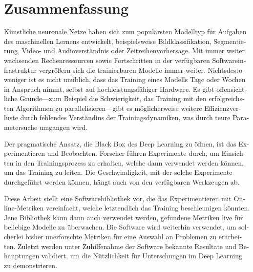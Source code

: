 \chapter*{Zusammenfassung}

\begin{otherlanguage}{german}
     Künstliche neuronale Netze haben sich zum populärsten Modelltyp für
     Aufgaben des maschinellen Lernens entwickelt, beispielsweise
     Bildklassifikation, Segmentierung, Video- und Audioverständnis oder
     Zeitreihenvorhersage. Mit immer weiter wachsenden Rechenressourcen sowie
     Fortschritten in der verfügbaren Softwareinfrastruktur vergrößern sich die
     trainierbaren Modelle immer weiter. Nichtsdestoweniger ist es nicht
     unüblich, dass das Training eines Modells Tage oder Wochen in Anspruch
     nimmt, selbst auf hochleistungsfähiger Hardware. Es gibt offensichtliche
     Gründe---zum Beispiel die Schwierigkeit, das Training mit den
     erfolgreichsten Algorithmen zu parallelisieren---gibt es möglicherweise
     weitere Effizienzverluste durch fehlendes Verständins der
     Trainingsdynamiken, was durch teure Parametersuche umgangen wird.

     Der pragmatische Ansatz, die Black Box des Deep Learning zu öffnen, ist das
     Experimentieren und Beobachten. Forscher führen Experimente durch, um
     Einsichten in den Trainingsprozess zu erhalten, welche dann verwendet
     werden können, um das Training zu leiten. Die Geschwindigkeit, mit der
     solche Experimente durchgeführt werden können, hängt auch von den verfügbaren
     Werkzeugen ab.

     Diese Arbeit stellt eine Softwarebibliothek vor, die das Experimentieren
     mit Online-Metriken vereinfacht, welche letztendlich das Training
     beschleunigen könnten. Jene Bibliothek kann dann auch verwendet werden,
     gefundene Metriken live für beliebige Modelle zu überwachen. Die Software
     wird weiterhin verwendet, um solcherlei bisher unerforschte Metriken für
     eine Auswahl an Problemen zu erarbeiten. Zuletzt werden unter Zuhilfenahme
     der Software bekannte Resultate und Behauptungen validiert, um die
     Nützlichkeit für Unterschungen im Deep Learning zu demonstrieren.

\end{otherlanguage}
